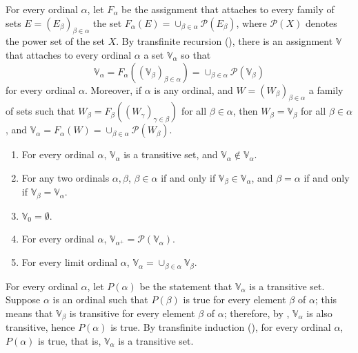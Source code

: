 \documentclass{article}
\begin{document}
For every ordinal \(\alpha\), let \(F_\alpha\) be the assignment that
attaches to every family of sets \(E = (E_\beta)_{\beta \in \alpha}\)
the set
\(F_\alpha(E) = \cup_{\beta \in \alpha} \mathcal{P}(E_\beta)\), where
\(\mathcal{P}(X)\) denotes the power set of the set \(X\).  By
transfinite recursion (), there is an assignment
\(\mathbb{V}\) that attaches to every ordinal \(\alpha\) a set
\(\mathbb{V}_\alpha\) so that
\begin{displaymath}
  \mathbb{V}_\alpha =
  F_\alpha ((\mathbb{V}_\beta)_{\beta \in \alpha}) =
  \cup_{\beta \in \alpha} \mathcal{P}(\mathbb{V}_\beta)
\end{displaymath}
for every ordinal \(\alpha\).  Moreover, if \(\alpha\) is any ordinal,
and \(W = (W_\beta)_{\beta \in \alpha}\) a family of sets such that
\(W_\beta = F_\beta ((W_\gamma)_{\gamma \in \beta})\) for all
\(\beta \in \alpha\), then \(W_\beta = \mathbb{V}_\beta\) for all
\(\beta \in \alpha\), and
\(\mathbb{V}_\alpha = F_\alpha(W) = \cup_{\beta \in
  \alpha}\mathcal{P}(W_\beta)\).

\begin{theorem}
  \label{thm:xijkf7v0}
  \begin{enumerate}
  \item For every ordinal \(\alpha\), \(\mathbb{V}_\alpha\) is a
    transitive set, and
    \(\mathbb{V}_\alpha \notin \mathbb{V}_\alpha\).
  \item For any two ordinals \(\alpha, \beta\), \(\beta \in \alpha\)
    if and only if \(\mathbb{V}_\beta \in \mathbb{V}_\alpha\), and
    \(\beta = \alpha\) if and only if
    \(\mathbb{V}_\beta = \mathbb{V}_\alpha\).
  \item \(\mathbb{V}_0 = \emptyset\).
  \item For every ordinal \(\alpha\),
    \(\mathbb{V}_{\alpha^+} = \mathcal{P}(\mathbb{V}_\alpha)\).
  \item For every limit ordinal \(\alpha\),
    \(\mathbb{V}_\alpha = \cup_{\beta \in \alpha}\mathbb{V}_\beta\).
  \end{enumerate}
\end{theorem}

For every ordinal \(\alpha\), let \(P(\alpha)\) be the statement that
\(\mathbb{V}_\alpha\) is a transitive set.  Suppose \(\alpha\) is an
ordinal such that \(P(\beta)\) is true for every element \(\beta\) of
\(\alpha\); this means that \(\mathbb{V}_\beta\) is transitive for
every element \(\beta\) of \(\alpha\); therefore, by
, \(\mathbb{V}_\alpha\) is also transitive, hence
\(P(\alpha)\) is true.  By transfinite induction
(), for every ordinal \(\alpha\), \(P(\alpha)\) is
true, that is, \(\mathbb{V}_\alpha\) is a transitive set.
\end{document}
